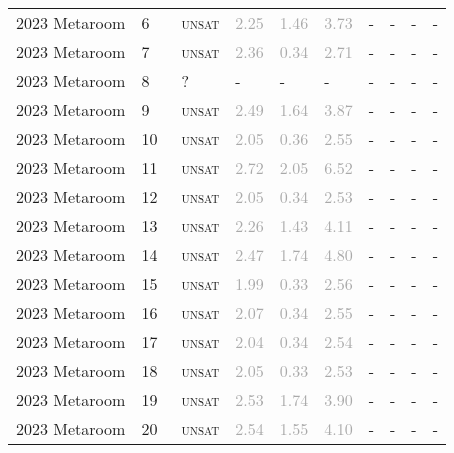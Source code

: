 \begin{center}
{\begin{longtable}{@{}llllllllll@{}}
2023 Metaroom & 6 & ~\textsc{unsat} & \textcolor{darkgray}{2.25} & \textcolor{darkgray}{1.46} & \textcolor{darkgray}{3.73} & - & - & - & - \\
2023 Metaroom & 7 & ~\textsc{unsat} & \textcolor{darkgray}{2.36} & \textcolor{darkgray}{0.34} & \textcolor{darkgray}{2.71} & - & - & - & - \\
2023 Metaroom & 8 & ~? & - & - & - & - & - & - & - \\
2023 Metaroom & 9 & ~\textsc{unsat} & \textcolor{darkgray}{2.49} & \textcolor{darkgray}{1.64} & \textcolor{darkgray}{3.87} & - & - & - & - \\
2023 Metaroom & 10 & ~\textsc{unsat} & \textcolor{darkgray}{2.05} & \textcolor{darkgray}{0.36} & \textcolor{darkgray}{2.55} & - & - & - & - \\
2023 Metaroom & 11 & ~\textsc{unsat} & \textcolor{darkgray}{2.72} & \textcolor{darkgray}{2.05} & \textcolor{darkgray}{6.52} & - & - & - & - \\
2023 Metaroom & 12 & ~\textsc{unsat} & \textcolor{darkgray}{2.05} & \textcolor{darkgray}{0.34} & \textcolor{darkgray}{2.53} & - & - & - & - \\
2023 Metaroom & 13 & ~\textsc{unsat} & \textcolor{darkgray}{2.26} & \textcolor{darkgray}{1.43} & \textcolor{darkgray}{4.11} & - & - & - & - \\
2023 Metaroom & 14 & ~\textsc{unsat} & \textcolor{darkgray}{2.47} & \textcolor{darkgray}{1.74} & \textcolor{darkgray}{4.80} & - & - & - & - \\
2023 Metaroom & 15 & ~\textsc{unsat} & \textcolor{darkgray}{1.99} & \textcolor{darkgray}{0.33} & \textcolor{darkgray}{2.56} & - & - & - & - \\
2023 Metaroom & 16 & ~\textsc{unsat} & \textcolor{darkgray}{2.07} & \textcolor{darkgray}{0.34} & \textcolor{darkgray}{2.55} & - & - & - & - \\
2023 Metaroom & 17 & ~\textsc{unsat} & \textcolor{darkgray}{2.04} & \textcolor{darkgray}{0.34} & \textcolor{darkgray}{2.54} & - & - & - & - \\
2023 Metaroom & 18 & ~\textsc{unsat} & \textcolor{darkgray}{2.05} & \textcolor{darkgray}{0.33} & \textcolor{darkgray}{2.53} & - & - & - & - \\
2023 Metaroom & 19 & ~\textsc{unsat} & \textcolor{darkgray}{2.53} & \textcolor{darkgray}{1.74} & \textcolor{darkgray}{3.90} & - & - & - & - \\
2023 Metaroom & 20 & ~\textsc{unsat} & \textcolor{darkgray}{2.54} & \textcolor{darkgray}{1.55} & \textcolor{darkgray}{4.10} & - & - & - & - \\

\end{longtable}}
\end{center}
